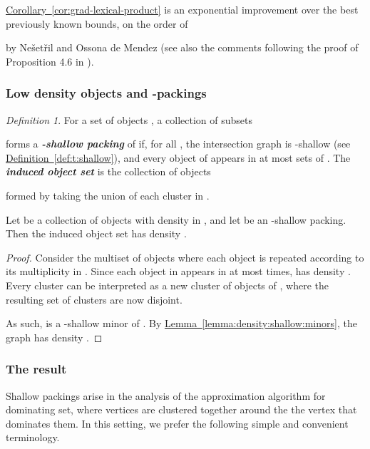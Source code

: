 \documentclass[12pt]{article}
\newcommand{\emphic}[2]{\textcolor{blue25}{\textbf{\emph{#1}}}\index{#2}}
\renewcommand{\emphic}[2]{\textbf{\emph{#1}}}
\newcommand{\emphi}[1]{\emphic{#1}{#1}}
\theoremstyle{remark}\theoremheaderfont{\sf}\theorembodyfont{\upshape}
\newtheorem{defn}[theorem]{Definition}
\numberwithin{figure}{section}\numberwithin{table}{section}\numberwithin{equation}{section}
\newcommand{\HLinkShort}[2]{\hyperref[#2]{#1\ref*{#2}}}
\newcommand{\HLink}[2]{\hyperref[#2]{#1~\ref*{#2}}}
\newcommand{\HLinkPage}[2]{\hyperref[#2]{#1~\ref*{#2}}}
\newcommand{\seclab}[1]{\label{sec:#1}} \newcommand{\secref}[1]{\HLink{Section}{sec:#1}} \newcommand{\secrefpage}[1]{\HLinkPage{Section}{sec:#1}}
\newcommand{\corref}[1]{\HLink{Corollary}{cor:#1}}\newcommand{\correfshort}[1]{\HLinkShort{C}{cor:#1}}\newcommand{\correfpage}[1]{\HLinkPage{Corollary}{cor:#1}}
\newcommand{\defref}[1]{\HLink{Definition}{def:#1}}
\newcommand{\lemlab}[1]{\label{lemma:#1}}
\newcommand{\lemref}[1]{\HLink{Lemma}{lemma:#1}}
\newcommand{\Nesetril}{N{e{\v s}et{\v r}il}\xspace}
\newcommand{\si}[1]{#1}
\begin{document}
\corref{grad-lexical-product} is an exponential improvement over the
best previously known bounds, on the order of

by \Nesetril and Ossona \si{de} Mendez \cite{no-gcbe1-08} (see also
the comments following the proof of Proposition 4.6 in
\cite{no-s-12}).



\subsubsection{Low density objects and -packing{}s}
\seclab{l:d:o:packing}

\begin{defn}
  For a set of objects , a collection of subsets
  
  forms a \emphi{-shallow packing} of  if, for all
  , the intersection graph  is -shallow
  (see \defref{t:shallow}), and every object of  appears in
  at most  sets of .  The \emphi{induced object set}
   is the collection of objects
  
  formed by taking the union of each cluster in .
\end{defn}

\begin{lemma}\lemlab{shallow:cover:objects}Let  be a collection of objects with density  in
  , and let  be an -shallow packing. Then
  the induced object set  has density
  .
\end{lemma}

\begin{proof}
  Consider the multiset of objects
   where each
  object  is repeated according to its multiplicity in
  . Since each object in  appears in  at
  most  times,  has density .  Every
  cluster  can be interpreted as a new cluster
   of objects of , where the resulting set of
  clusters  are
  now disjoint.

  As such,  is a -shallow minor of
  . By \lemref{density:shallow:minors}, the graph
   has density
  .
\end{proof}

\subsubsection{The result}

Shallow packings arise in the analysis of the approximation algorithm
for dominating set, where vertices are clustered together around the
the vertex that dominates them. In this setting, we prefer the
following simple and convenient terminology.
\end{document}
